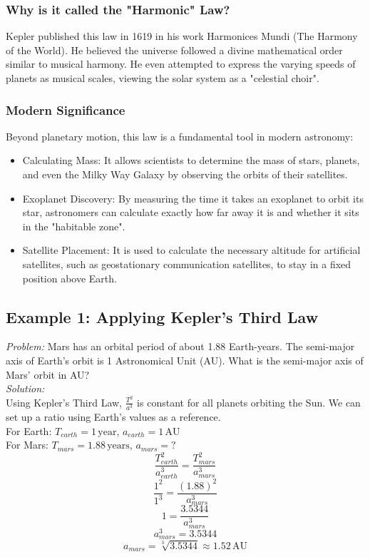 \documentclass[a4paper,10pt]{article}
\begin{document}
\subsubsection{Why is it called the "Harmonic" Law?}
Kepler published this law in 1619 in his work Harmonices Mundi (The Harmony of the World). He believed the universe followed a divine mathematical order similar to musical harmony. He even attempted to express the varying speeds of planets as musical scales, viewing the solar system as a "celestial choir".
\subsubsection{Modern Significance}
Beyond planetary motion, this law is a fundamental tool in modern astronomy:
\begin{itemize}
\item Calculating Mass: It allows scientists to determine the mass of stars, planets, and even the Milky Way Galaxy by observing the orbits of their satellites.
\item Exoplanet Discovery: By measuring the time it takes an exoplanet to orbit its star, astronomers can calculate exactly how far away it is and whether it sits in the "habitable zone".
\item Satellite Placement: It is used to calculate the necessary altitude for artificial satellites, such as geostationary communication satellites, to stay in a fixed position above Earth.
\end{itemize}
\subsection{Example 1: Applying Kepler's Third Law}
\emph{Problem:} Mars has an orbital period of about 1.88 Earth-years. The semi-major axis of Earth's orbit is 1 Astronomical Unit (AU). What is the semi-major axis of Mars' orbit in AU?\\
\emph{Solution:}\\
Using Kepler's Third Law, \( \frac{T^2}{a^3} \) is constant for all planets orbiting the Sun. We can set up a ratio using Earth's values as a reference.\\
For Earth: \( T_{earth} = 1 \, \text{year} \), \( a_{earth} = 1 \, \text{AU} \)\\
For Mars: \( T_{mars} = 1.88 \, \text{years} \), \( a_{mars} = ? \)\\

\[
\frac{T_{earth}^2}{a_{earth}^3} = \frac{T_{mars}^2}{a_{mars}^3}
\]
\[
\frac{1^2}{1^3} = \frac{(1.88)^2}{a_{mars}^3}
\]
\[
1 = \frac{3.5344}{a_{mars}^3}
\]
\[
a_{mars}^3 = 3.5344
\]
\[
a_{mars} = \sqrt[3]{3.5344} \approx 1.52 \, \text{AU}
\]
\end{document}
